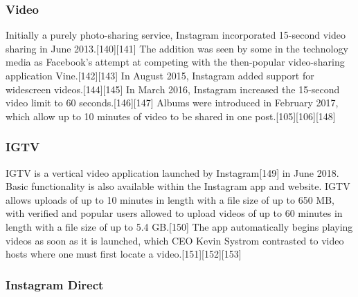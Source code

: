 \documentclass[12pt]{article}
\begin{document}
\subsubsection{Video}

Initially a purely photo-sharing service, Instagram incorporated 15-second video sharing in June 2013.[140][141] The addition was seen by some in the technology media as Facebook's attempt at competing with the then-popular video-sharing application Vine.[142][143] In August 2015, Instagram added support for widescreen videos.[144][145] In March 2016, Instagram increased the 15-second video limit to 60 seconds.[146][147] Albums were introduced in February 2017, which allow up to 10 minutes of video to be shared in one post.[105][106][148]








\subsubsection{IGTV}


IGTV is a vertical video application launched by Instagram[149] in June 2018. Basic functionality is also available within the Instagram app and website. IGTV allows uploads of up to 10 minutes in length with a file size of up to 650 MB, with verified and popular users allowed to upload videos of up to 60 minutes in length with a file size of up to 5.4 GB.[150] The app automatically begins playing videos as soon as it is launched, which CEO Kevin Systrom contrasted to video hosts where one must first locate a video.[151][152][153]








\subsubsection{Instagram Direct}
\end{document}
